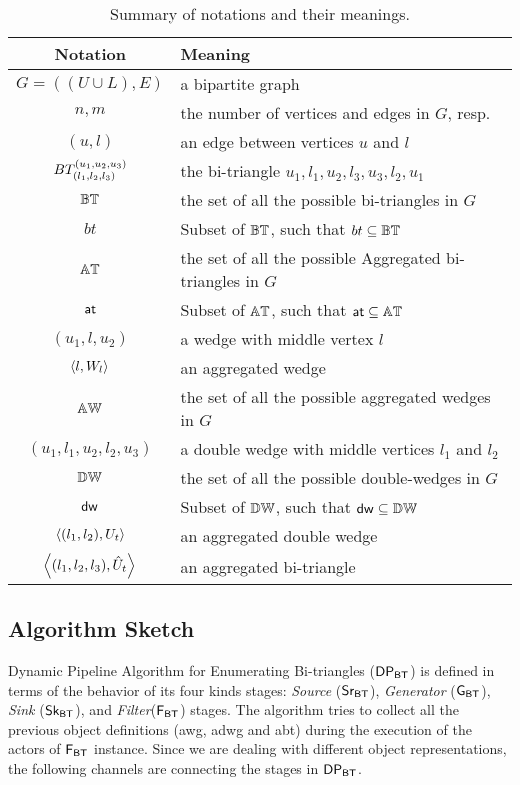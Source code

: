 \begin{table}[!ht]
\centering
\begin{tabular}{|c|l|} \hline
\textbf{Notation} & \textbf{Meaning}\\ \hline
$G=((U\cup L),E)$ & a bipartite graph\\  \hline
$n,m$ & the number of vertices and edges in $G$, resp.\\  \hline
$(u,l)$ & an edge between vertices $u$ and $l$\\  \hline
$BT_{(l_1, l_2,l_3)}^{(u_1, u_2, u_3)}$ & the bi-triangle $u_1,l_1,u_2,l_3,u_3,l_2,u_1$\\  \hline
$\mathbb{BT}$ & the set of all the possible bi-triangles in $G$ \\  \hline
$bt$ & Subset of $\mathbb{BT}$, such that $bt \subseteq \mathbb{BT}$ \\  \hline
$\mathbb{AT}$ & the set of all the possible Aggregated bi-triangles in $G$ \\  \hline
$\mathsf{at}$ & Subset of $\mathbb{AT}$, such that $\mathsf{at} \subseteq \mathbb{AT}$ \\  \hline 
$(u_1,l,u_2)$ & a wedge with  middle vertex $l$\\  \hline
$\left\langle l, W_l \right\rangle$ & an aggregated wedge\\  \hline
$\mathbb{AW}$ & the set of all the possible aggregated wedges in $G$\\  \hline
$(u_1,l_1,u_2,l_2,u_3)$ & a double wedge with middle vertices $l_1$ and $l_2$\\  \hline 
$\mathbb{DW}$ & the set of all the possible double-wedges in $G$\\  \hline
$\mathsf{dw}$ & Subset of $\mathbb{DW}$, such that $\mathsf{dw} \subseteq \mathbb{DW}$ \\  \hline
$\left\langle (l_1, l_2), U_t \right\rangle$ & an aggregated double wedge\\  \hline
$\left\langle (l_1, l_2,l_3), \hat{U}_t \right\rangle$ & an aggregated bi-triangle\\  \hline
\end{tabular}
\caption{Summary of notations and their meanings.}
\label{table:notation}
\end{table}
      

\subsection{Algorithm Sketch}\label{sub:sec:algo-sketch}
Dynamic Pipeline Algorithm for Enumerating Bi-triangles ($\mathsf{DP_{BT}}$) is defined in terms of the behavior of its four kinds stages: \textit{Source} ($\mathsf{Sr_{BT}}$),  
\textit{Generator} ($\mathsf{G_{BT}}$),  \textit{Sink} ($\mathsf{Sk_{BT}}$), and \textit{Filter}($\mathsf{F_{BT}}$) stages. The algorithm tries to collect all the previous object definitions 
(\acrshort{awg}, \acrshort{adwg} and \acrshort{abt}) during the execution of the actors of $\mathsf{F_{BT}}$ instance. Since we are dealing with different object representations,
the following channels are connecting the stages in $\mathsf{DP_{BT}}$.

